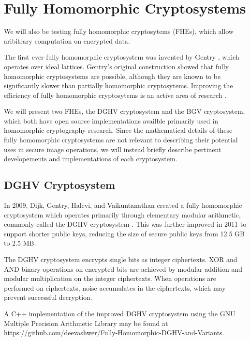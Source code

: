 \section{Fully Homomorphic Cryptosystems}

We will also be testing fully homomorphic cryptosytems (FHEs), which allow aribitrary computation on encrypted data.

The first ever fully homomorphic cryptosystem was invented by Gentry \cite{gentry_fully_2009}, which operates over ideal lattices. Gentry's original construction showed that fully homomorphic cryptosystems are possible, although they are known to be significantly slower than partially homomorphic cryptosytems. 
Improving the efficiency of fully homomorphic cryptosytems is an active area of research \cite{sen_homomorphic_2013}. 

We will present two FHEs, the DGHV cryptosystem and the BGV cryptosystem, which both have open source implementations availble primarily used in homomorphic cryptography research. Since the mathematical details of these fully homomorphic cryptosystems are not relevant to describing their potential uses in secure image operations, we will instead briefly describe pertinent developements and implementations of each cryptosystem.

\subsection{DGHV Cryptosystem}
In 2009, Dijk, Gentry, Halevi, and Vaikuntanathan created a fully homomorphic cryptosystem which operates primarily through elementary modular arithmetic, commonly called the DGHV cryptosystem \cite{cryptoeprint:2009:616}. This was further improved in 2011 \cite{cryptoeprint:2011:277, cryptoeprint:2011:440} to support shorter public keys, reducing the size of secure public keys from 12.5 GB to 2.5 MB. 

The DGHV cryptosystem encrypts single bits as integer ciphertexts. XOR and AND binary operations on encrypted bits are achieved by modular addition and modular multiplication on the integer ciphertexts. When operations are performed on ciphertexts, noise accumulates in the ciphertexts, which may prevent successful decryption.



A C++ implementation of the improved DGHV cryptosystem \cite{cryptoeprint:2011:440} using the GNU Multiple Precision Arithmetic Library may be found at https://github.com/deevashwer/Fully-Homomorphic-DGHV-and-Variants.

